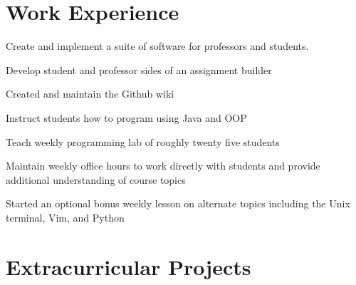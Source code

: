 \documentclass[]{deedy-resume-openfont}
\begin{document}
\begin{minipage}[t]{0.66\textwidth}



\section{Work Experience}

\linebreak
{}
\vspace{\topsep} %
\begin{tightemize}
\item Create and implement a suite of software for professors and students.
\item Develop student and professor sides of an assignment builder
\item Created and maintain the Github wiki
\end{tightemize}
\sectionsep

\linebreak
{}
\begin{tightemize}
\item Instruct students how to program using Java and OOP
\item Teach weekly programming lab of roughly twenty five students
\item Maintain weekly office hours to work directly with students and provide additional understanding of course topics
\item Started an optional bonus weekly lesson on alternate topics including the Unix terminal, Vim, and Python
\end{tightemize}

\sectionsep




\section{Extracurricular Projects}


\end{minipage}
\end{document}
